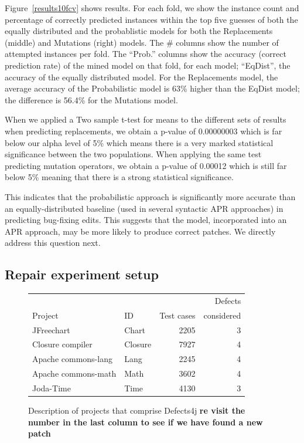 \documentclass[conference]{IEEEtran}
\newcommand{\todo}[1]
  {{\scriptsize \textbf{\color{red} {#1}}}}
\begin{document}
Figure~\ref{results10fcv} shows results. For each fold, we show the instance
count and percentage of correctly predicted instances within the top five
guesses of both the equally distributed and the probablistic models for both the
Replacements (middle) and Mutations (right) models. The \# columns 
show the number of attempted instances per fold.  The ``Prob.'' columns show the
accuracy (correct prediction rate) of the mined model on that fold, for each model; ``EqDist'',
the accuracy of the equally distributed model.  For the Replacements model,
the average accuracy of the Probabilistic model is 63\% higher than the EqDist
model; the difference is 56.4\% for the Mutations model.

When we applied a Two sample t-test for means to the different sets of results when predicting replacements, we obtain a p-value of 0.00000003 which is far below our alpha level of 5\% which means there is a very marked statistical significance between the two populations. When applying the same test predicting mutation operators, we obtain a p-value of 0.00012 which is still far below 5\% meaning that there is a strong statistical significance.

This indicates that the probabilistic approach is
significantly more accurate than an equally-distributed baseline (used in
several syntactic APR approaches) in predicting bug-fixing edits.  This suggests
that the model, incorporated into an APR approach, may be more likely to produce
correct patches.  We directly address this question next.


\subsection{Repair experiment setup}
\label{sec:repairSetup}

\begin{figure}[ht]
\centering

\begin{tabular}{llrr}
\toprule
         &     &            &  Defects\\
 Project & ID & Test cases & considered \\
\midrule
JFreechart & Chart & 2205 & 3\\
Closure compiler & Closure & 7927 & 4\\
Apache commons-lang & Lang  & 2245 & 4\\
Apache commons-math & Math & 3602 & 4\\
Joda-Time & Time & 4130 & 3\\
\bottomrule
\end{tabular}
\center
  \caption{Description of projects that comprise Defects4j \todo{re visit the number in the last column to see if we have found a new patch}  \label{defects4j}}
\end{figure} 
\end{document}
